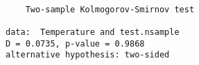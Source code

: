 \begin{verbatim} 

	Two-sample Kolmogorov-Smirnov test

data:  Temperature and test.nsample
D = 0.0735, p-value = 0.9868
alternative hypothesis: two-sided

\end{verbatim}